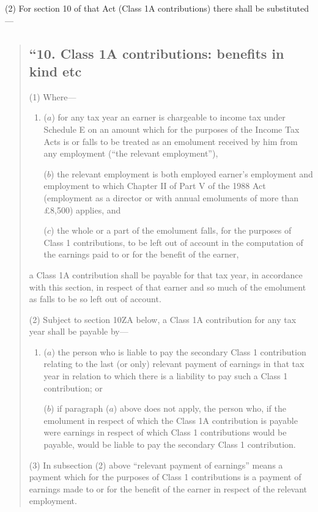 \documentclass[12pt,a4paper]{article}
\begin{document}
(2) For section 10 of that Act (Class 1A contributions) there shall be substituted—
\begin{quotation}
\subsection*{“10. Class 1A contributions: benefits in kind etc}

(1) Where—
\begin{enumerate}\item[]
($a$) for any tax year an earner is chargeable to income tax under Schedule E on an amount which for the purposes of the Income Tax Acts is or falls to be treated as an emolument received by him from any employment (“the relevant employment”),

($b$) the relevant employment is both employed earner’s employment and employment to which Chapter II of Part V of the 1988 Act (employment as a director or with annual emoluments of more than £8,500) applies, and

($c$) the whole or a part of the emolument falls, for the purposes of Class 1 contributions, to be left out of account in the computation of the earnings paid to or for the benefit of the earner,
\end{enumerate}
a Class 1A contribution shall be payable for that tax year, in accordance with this section, in respect of that earner and so much of the emolument as falls to be so left out of account.

(2) Subject to section 10ZA below, a Class 1A contribution for any tax year shall be payable by—
\begin{enumerate}\item[]
($a$) the person who is liable to pay the secondary Class 1 contribution relating to the last (or only) relevant payment of earnings in that tax year in relation to which there is a liability to pay such a Class 1 contribution; or

($b$) if paragraph ($a$)  above does not apply, the person who, if the emolument in respect of which the Class 1A contribution is payable were earnings in respect of which Class 1 contributions would be payable, would be liable to pay the secondary Class 1 contribution.
\end{enumerate}

(3) In subsection (2)  above “relevant payment of earnings” means a payment which for the purposes of Class 1 contributions is a payment of earnings made to or for the benefit of the earner in respect of the relevant employment.


\end{quotation}
\end{document}

